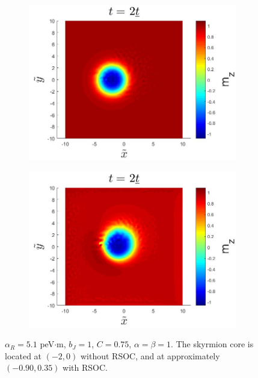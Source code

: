 \begin{figure}[h!]
\begin{subfigure}{.45\textwidth}
  \centering
  \includegraphics[width=\linewidth]{Figures/SkyrmionMzRSOCR0.jpg}
  \caption{}
\end{subfigure}
\begin{subfigure}{.45\textwidth}
  \centering
  \includegraphics[width=\linewidth]{Figures/SkyrmionMzRSOC.jpg}
  \caption{}
\end{subfigure}
\caption{$\alpha_R=5.1$ peV$\cdot$m, $b_J=1$, $C=0.75$, $\alpha=\beta=1$. The skyrmion core is located at $\left(-2,0\right)$ without RSOC, and at approximately $\left(-0.90,0.35\right)$ with RSOC. }
\label{fig:SkyrmionRSOC}
\end{figure}

